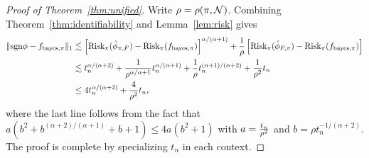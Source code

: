 \documentclass[11pt]{article}
\theoremstyle{plain}
\theoremstyle{definition}
\def\sign{\textup{sgn}}
\def\bayespif{f_{\textup{bayes},\pi}}
\def\risk{\textup{Risk}_\pi}
\begin{document}
\begin{proof}[Proof of Theorem~\ref{thm:unified}]
Write $\rho=\rho(\pi,\mathcal{N})$. Combining Theorem~\ref{thm:identifiability} and Lemma~\ref{lem:risk} gives
\begin{align}
\onenormSize{}{\sign \phi-\bayespif} &\lesssim \left[\risk(\hat \phi_{\pi,F})-\risk(\bayespif)\right]^{\alpha/(\alpha+1)}+{1\over \rho}\left[\risk(\hat \phi_{F,\pi})-\risk(\bayespif)\right]\\
&\lesssim t_n^{\alpha/(\alpha+2)}+{1\over \rho^{\alpha/\alpha+1}}t_n^{\alpha/(\alpha+1)}+{1\over \rho}t_n^{(\alpha+1)/(\alpha+2)}+{1\over \rho^2}t_n\notag \\
&\leq 4t_n^{\alpha/(\alpha+2)}+{4\over \rho^2}t_n,
\end{align}
where the last line follows from the fact that $a(b^2+b^{(\alpha+2)/(\alpha+1)}+b+1) \leq 4 a (b^2+1)$ with $a={t_n \over \rho^2}$ and $b=\rho t_n^{-1/(\alpha+2)}$. The proof is complete by specializing $t_n$ in each context. 
\end{proof}
\end{document}
